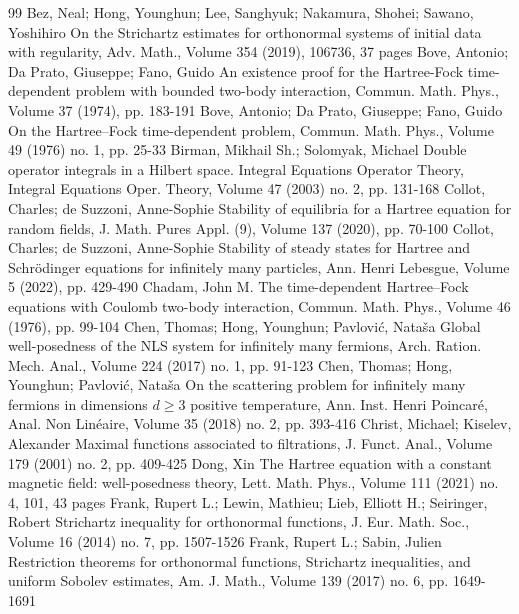 \begin{thebibliography}{99}
 Bez, Neal; Hong, Younghun; Lee, Sanghyuk; Nakamura, Shohei; Sawano, Yoshihiro On the Strichartz estimates for orthonormal systems of initial data with regularity, Adv. Math., Volume 354 (2019), 106736, 37 pages
 Bove, Antonio; Da Prato, Giuseppe; Fano, Guido An existence proof for the Hartree-Fock time-dependent problem with bounded two-body interaction, Commun. Math. Phys., Volume 37 (1974), pp. 183-191
 Bove, Antonio; Da Prato, Giuseppe; Fano, Guido On the Hartree–Fock time-dependent problem, Commun. Math. Phys., Volume 49 (1976) no. 1, pp. 25-33
 Birman, Mikhail Sh.; Solomyak, Michael Double operator integrals in a Hilbert space. Integral Equations Operator Theory, Integral Equations Oper. Theory, Volume 47 (2003) no. 2, pp. 131-168
 Collot, Charles; de Suzzoni, Anne-Sophie Stability of equilibria for a Hartree equation for random fields, J. Math. Pures Appl. (9), Volume 137 (2020), pp. 70-100
 Collot, Charles; de Suzzoni, Anne-Sophie Stability of steady states for Hartree and Schrödinger equations for infinitely many particles, Ann. Henri Lebesgue, Volume 5 (2022), pp. 429-490
 Chadam, John M. The time-dependent Hartree–Fock equations with Coulomb two-body interaction, Commun. Math. Phys., Volume 46 (1976), pp. 99-104
 Chen, Thomas; Hong, Younghun; Pavlović, Nataša Global well-posedness of the NLS system for infinitely many fermions, Arch. Ration. Mech. Anal., Volume 224 (2017) no. 1, pp. 91-123
 Chen, Thomas; Hong, Younghun; Pavlović, Nataša On the scattering problem for infinitely many fermions in dimensions $d \ge 3$ positive temperature, Ann. Inst. Henri Poincaré, Anal. Non Linéaire, Volume 35 (2018) no. 2, pp. 393-416
 Christ, Michael; Kiselev, Alexander Maximal functions associated to filtrations, J. Funct. Anal., Volume 179 (2001) no. 2, pp. 409-425
 Dong, Xin The Hartree equation with a constant magnetic field: well-posedness theory, Lett. Math. Phys., Volume 111 (2021) no. 4, 101, 43 pages
 Frank, Rupert L.; Lewin, Mathieu; Lieb, Elliott H.; Seiringer, Robert Strichartz inequality for orthonormal functions, J. Eur. Math. Soc., Volume 16 (2014) no. 7, pp. 1507-1526
 Frank, Rupert L.; Sabin, Julien Restriction theorems for orthonormal functions, Strichartz inequalities, and uniform Sobolev estimates, Am. J. Math., Volume 139 (2017) no. 6, pp. 1649-1691

\end{thebibliography}
